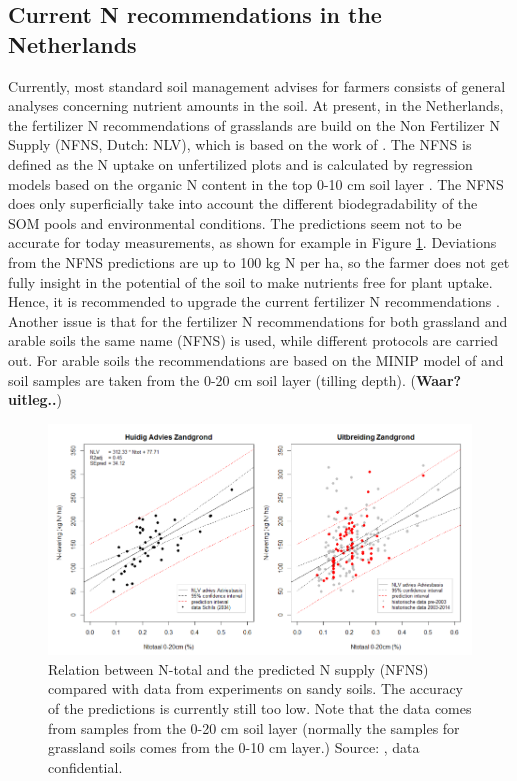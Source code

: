 \documentclass[10pt,twoside,dutch,english]{report}
\begin{document}
\subsection{Current N recommendations in the Netherlands} %
Currently, most standard soil management advises for farmers consists of general analyses concerning nutrient amounts in the soil. At present, in the Netherlands, the fertilizer N recommendations of grasslands are build on the Non Fertilizer N Supply (NFNS, Dutch: NLV), which is based on the work of \citet{Hassink1995a}. The NFNS is defined as the N uptake on unfertilized plots and is calculated by regression models based on the organic N content in the top 0-10 cm soil layer \citep{Bemestingscommissie2012}. The NFNS does only superficially take into account the different biodegradability of the SOM pools and environmental conditions. The predictions seem not to be accurate for today measurements, as shown for example in Figure \ref{fig:intro_ros}. Deviations from the NFNS predictions are up to 100 kg N per ha, so the farmer does not get fully insight in the potential of the soil to make nutrients free for plant uptake. Hence, it is recommended to upgrade the current fertilizer N recommendations \citep{Hanegraaf2009, VanEekeren2010, Ros2015}. Another issue is that for the fertilizer N recommendations for both grassland and arable soils the same name (NFNS) is used, while different protocols are carried out. For arable soils the recommendations are based on the MINIP model of \citet{Janssen1984} and soil samples are taken from the 0-20 cm soil layer (tilling depth). (\textbf{Waar? uitleg..})\\

		\begin{figure}[t]
			\includegraphics[width=1\linewidth]{intro_ros}
			\caption{Relation between N-total and the predicted N supply (NFNS) compared with data from experiments on sandy soils. The accuracy of the predictions is currently still too low. Note that the data comes from samples from the 0-20 cm soil layer (normally the samples for grassland soils comes from the 0-10 cm layer.) Source:   \citet{Ros2015}, data confidential.}
			\label{fig:intro_ros}
		\end{figure}
		
\end{document}
